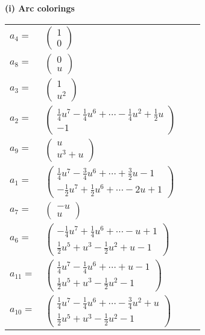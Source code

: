 \documentclass[1p]{elsarticle_modified}
\theoremstyle{definition}
\begin{document}
\flushleft \textbf{(i) Arc colorings}\\
\begin{tabular}{m{7pt} m{180pt} m{7pt} m{180pt} }
\flushright $a_{4}=$&$\begin{pmatrix}1\\0\end{pmatrix}$ \\
\flushright $a_{8}=$&$\begin{pmatrix}0\\u\end{pmatrix}$ \\
\flushright $a_{3}=$&$\begin{pmatrix}1\\u^2\end{pmatrix}$ \\
\flushright $a_{2}=$&$\begin{pmatrix}\frac{1}{4} u^7-\frac{1}{4} u^6+\cdots-\frac{1}{4} u^2+\frac{1}{2} u\\-1\end{pmatrix}$ \\
\flushright $a_{9}=$&$\begin{pmatrix}u\\u^3+u\end{pmatrix}$ \\
\flushright $a_{1}=$&$\begin{pmatrix}\frac{1}{4} u^7-\frac{3}{4} u^6+\cdots+\frac{3}{2} u-1\\-\frac{1}{2} u^7+\frac{1}{2} u^6+\cdots-2 u+1\end{pmatrix}$ \\
\flushright $a_{7}=$&$\begin{pmatrix}- u\\u\end{pmatrix}$ \\
\flushright $a_{6}=$&$\begin{pmatrix}-\frac{1}{4} u^7+\frac{1}{4} u^6+\cdots- u+1\\\frac{1}{2} u^5+u^3-\frac{1}{2} u^2+u-1\end{pmatrix}$ \\
\flushright $a_{11}=$&$\begin{pmatrix}\frac{1}{4} u^7-\frac{1}{4} u^6+\cdots+u-1\\\frac{1}{2} u^5+u^3-\frac{1}{2} u^2-1\end{pmatrix}$ \\
\flushright $a_{10}=$&$\begin{pmatrix}\frac{1}{4} u^7-\frac{1}{4} u^6+\cdots-\frac{3}{4} u^2+u\\\frac{1}{2} u^5+u^3-\frac{1}{2} u^2-1\end{pmatrix}$ \\

\end{tabular}
\end{document}
